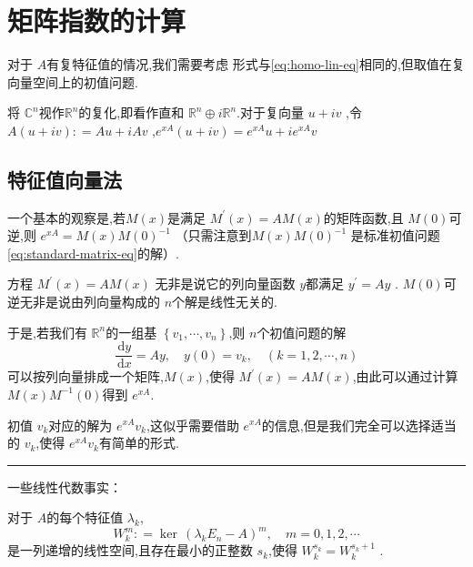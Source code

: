 \documentclass[lang=cn,12pt,color=green,fontset=none]{elegantbook}
\begin{document}
\section{矩阵指数的计算}

对于 \(  A  \)有复特征值的情况,我们需要考虑 形式与\ref{eq:homo-lin-eq}相同的,但取值在复向量空间上的初值问题.

将 \(  \mathbb{C}^{n}  \)视作\(  \mathbb{R} ^{n}  \)的复化,即看作直和 \(  \mathbb{R} ^{n}\oplus i\mathbb{R} ^{n}  \).对于复向量 \(  u+ iv  \)  ,令 \(  A\left( u+ iv \right): = Au+ iAv   \) ,\(  e^{xA}\left( u+ iv \right)=e^{xA}u+ ie^{xA}v   \) 


\subsection{特征值向量法}

一个基本的观察是,若\(  M\left( x \right)   \)是满足 \(  M^{\prime} \left( x \right)=AM\left( x \right)    \)的矩阵函数,且 \(  M\left( 0 \right)   \)可逆,则 \(  e^{xA}=M\left( x \right)M\left( 0 \right)^{-1}     \)    （只需注意到\(  M\left( x \right)M\left( 0 \right)^{-1}     \) 是标准初值问题\ref{eq:standard-matrix-eq}的解）.

方程 \(  M^{\prime} \left( x \right)=AM\left( x \right)    \) 无非是说它的列向量函数 \(  y  \)都满足 \(  y^{\prime} =Ay  \) . \(  M\left( 0 \right)   \)可逆无非是说由列向量构成的 \(  n  \)个解是线性无关的.

于是,若我们有 \(  \mathbb{R} ^{n}  \)的一组基 \(  \left\{ v_1,\cdots ,v_{n} \right\}  \),则 \(  n  \)个初值问题的解 \[
\frac{\,\mathrm{d} y }{\,\mathrm{d} x }=Ay,\quad y\left( 0 \right)=v_{k},\quad \left( k=1,2,\cdots,n \right)   
\]可以按列向量排成一个矩阵,\(  M\left( x \right)   \),使得 \(  M^{\prime} \left( x \right)=AM\left( x \right)    \),由此可以通过计算 \(  M\left( x \right)   M^{-1} \left( 0 \right) \)得到 \(  e^{xA}  \).       

初值 \(  v_{k}  \)对应的解为 \(  e^{xA}v_{k}  \),这似乎需要借助 \(  e^{xA}  \)的信息,但是我们完全可以选择适当的 \(  v_{k}  \),使得 \(  e^{xA}v_{k}  \)有简单的形式.  
 
 \hspace*{\fill} 
 \hrule
 \hspace*{\fill}
 

\noindent
\begin{large}       
    一些线性代数事实：
\end{large}    

对于 \(  A  \)的每个特征值 \(   \lambda _{k}  \), \[
W_{k}^{m}: = \operatorname{ker}\,\left(  \lambda _{k}E_{n}-A \right)^{m},\quad m=0,1,2,\cdots  
\]是一列递增的线性空间,且存在最小的正整数 \(  s _{k}  \),使得 \(  W_{k}^{s_{k}}=W_{k}^{s_{k}+ 1}  \) .
\end{document}
